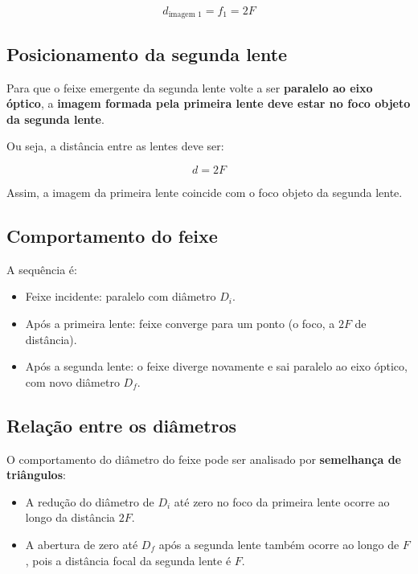 \documentclass[a4paper,12pt]{article}
\begin{document}
\begin{flushleft}
\begin{equation}
d_{\text{imagem 1}} = f_1 = 2F
\end{equation}

\subsection*{Posicionamento da segunda lente}

Para que o feixe emergente da segunda lente volte a ser \textbf{paralelo ao eixo óptico}, a \textbf{imagem formada pela primeira lente deve estar no foco objeto da segunda lente}.

Ou seja, a distância entre as lentes deve ser:

\begin{equation}
d = 2F
\end{equation}

Assim, a imagem da primeira lente coincide com o foco objeto da segunda lente.

\subsection*{Comportamento do feixe}

A sequência é:

\begin{itemize}
    \item Feixe incidente: paralelo com diâmetro \( D_i \).
    \item Após a primeira lente: feixe converge para um ponto (o foco, a \( 2F \) de distância).
    \item Após a segunda lente: o feixe diverge novamente e sai paralelo ao eixo óptico, com novo diâmetro \( D_f \).
\end{itemize}

\subsection*{Relação entre os diâmetros}

O comportamento do diâmetro do feixe pode ser analisado por \textbf{semelhança de triângulos}:

\begin{itemize}
    \item A redução do diâmetro de \( D_i \) até zero no foco da primeira lente ocorre ao longo da distância \( 2F \).
    \item A abertura de zero até \( D_f \) após a segunda lente também ocorre ao longo de \( F \), pois a distância focal da segunda lente é \( F \).
\end{itemize}


\end{flushleft}
\end{document}
